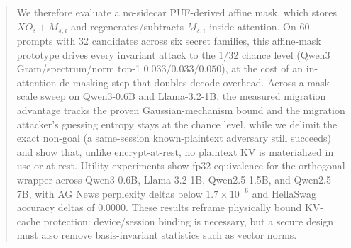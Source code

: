 \documentclass[conference,compsoc]{IEEEtran}
\newcommand{\IEEEpeerreviewmaketitle}{}
\theoremstyle{definition}
\theoremstyle{plain}
\begin{document}
\begin{abstract}
We therefore evaluate a no-sidecar PUF-derived affine mask, which stores $XO_s+M_{s,i}$ and regenerates/subtracts $M_{s,i}$ inside attention. On 60 prompts with 32 candidates across six secret families, this affine-mask prototype drives every invariant attack to the $1/32$ chance level (Qwen3 Gram/spectrum/norm top-1 $0.033/0.033/0.050$), at the cost of an in-attention de-masking step that doubles decode overhead. Across a mask-scale sweep on Qwen3-0.6B and Llama-3.2-1B, the measured migration advantage tracks the proven Gaussian-mechanism bound and the migration attacker's guessing entropy stays at the chance level, while we delimit the exact non-goal (a same-session known-plaintext adversary still succeeds) and show that, unlike encrypt-at-rest, no plaintext KV is materialized in use or at rest. Utility experiments show fp32 equivalence for the orthogonal wrapper across Qwen3-0.6B, Llama-3.2-1B, Qwen2.5-1.5B, and Qwen2.5-7B, with AG News perplexity deltas below $1.7\times10^{-6}$ and HellaSwag accuracy deltas of 0.0000. These results reframe physically bound KV-cache protection: device/session binding is necessary, but a secure design must also remove basis-invariant statistics such as vector norms.
\end{abstract}

\IEEEpeerreviewmaketitle









\end{document}
